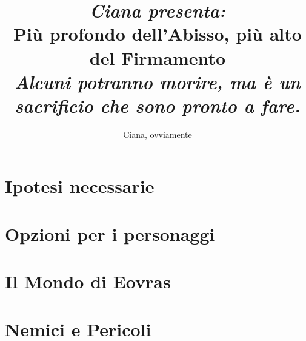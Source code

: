 \documentclass[letterpaper,twocolumn,openany,nodeprecatedcode]{dndbook}
\title{\large{\textit{Ciana presenta:}}\\
    Più profondo dell'Abisso, più alto del Firmamento \\
    \large {\textit{Alcuni potranno morire, ma è un sacrificio che sono pronto a fare.}}
    }
\author{Ciana, ovviamente}
\date{}
\begin{document}
\frontmatter

\maketitle

\tableofcontents

\mainmatter%

\part{Ipotesi necessarie}





\part{Opzioni per i personaggi}



































\part{Il Mondo di Eovras}







\part{Nemici e Pericoli}
\end{document}

